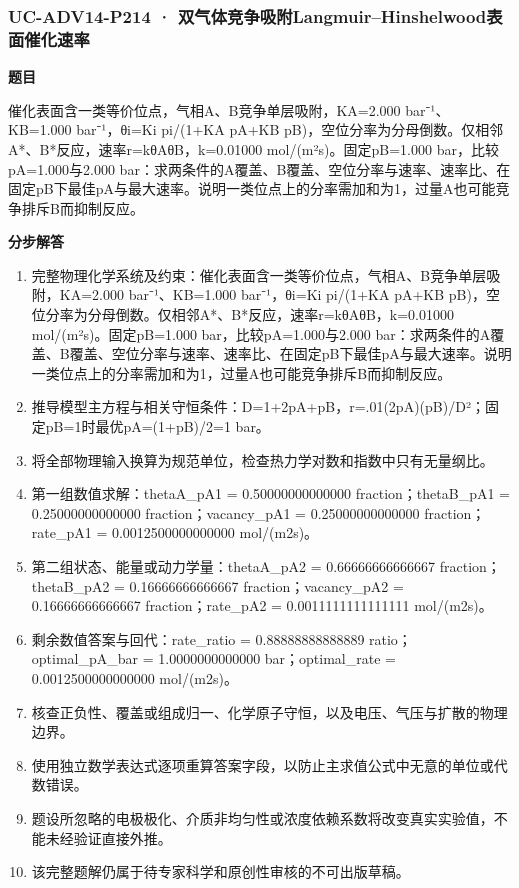 \documentclass[UTF8,11pt,a4paper]{ctexart}
\begin{document}
\subsubsection*{UC-ADV14-P214 · 双气体竞争吸附Langmuir–Hinshelwood表面催化速率}
\noindent\textbf{题目}\par
催化表面含一类等价位点，气相A、B竞争单层吸附，KA=2.000 bar⁻¹、KB=1.000 bar⁻¹，θi=Ki pi/(1+KA pA+KB pB)，空位分率为分母倒数。仅相邻A*、B*反应，速率r=kθAθB，k=0.01000 mol/(m²s)。固定pB=1.000 bar，比较pA=1.000与2.000 bar：求两条件的A覆盖、B覆盖、空位分率与速率、速率比、在固定pB下最佳pA与最大速率。说明一类位点上的分率需加和为1，过量A也可能竞争排斥B而抑制反应。\par
\medskip\noindent\textbf{分步解答}
\begin{enumerate}
\item 完整物理化学系统及约束：催化表面含一类等价位点，气相A、B竞争单层吸附，KA=2.000 bar⁻¹、KB=1.000 bar⁻¹，θi=Ki pi/(1+KA pA+KB pB)，空位分率为分母倒数。仅相邻A*、B*反应，速率r=kθAθB，k=0.01000 mol/(m²s)。固定pB=1.000 bar，比较pA=1.000与2.000 bar：求两条件的A覆盖、B覆盖、空位分率与速率、速率比、在固定pB下最佳pA与最大速率。说明一类位点上的分率需加和为1，过量A也可能竞争排斥B而抑制反应。
\item 推导模型主方程与相关守恒条件：D=1+2pA+pB，r=.01(2pA)(pB)/D²；固定pB=1时最优pA=(1+pB)/2=1 bar。
\item 将全部物理输入换算为规范单位，检查热力学对数和指数中只有无量纲比。
\item 第一组数值求解：thetaA\_pA1 = 0.50000000000000 fraction；thetaB\_pA1 = 0.25000000000000 fraction；vacancy\_pA1 = 0.25000000000000 fraction；rate\_pA1 = 0.0012500000000000 mol/(m2s)。
\item 第二组状态、能量或动力学量：thetaA\_pA2 = 0.66666666666667 fraction；thetaB\_pA2 = 0.16666666666667 fraction；vacancy\_pA2 = 0.16666666666667 fraction；rate\_pA2 = 0.0011111111111111 mol/(m2s)。
\item 剩余数值答案与回代：rate\_ratio = 0.88888888888889 ratio；optimal\_pA\_bar = 1.0000000000000 bar；optimal\_rate = 0.0012500000000000 mol/(m2s)。
\item 核查正负性、覆盖或组成归一、化学原子守恒，以及电压、气压与扩散的物理边界。
\item 使用独立数学表达式逐项重算答案字段，以防止主求值公式中无意的单位或代数错误。
\item 题设所忽略的电极极化、介质非均匀性或浓度依赖系数将改变真实实验值，不能未经验证直接外推。
\item 该完整题解仍属于待专家科学和原创性审核的不可出版草稿。
\end{enumerate}
\end{document}
